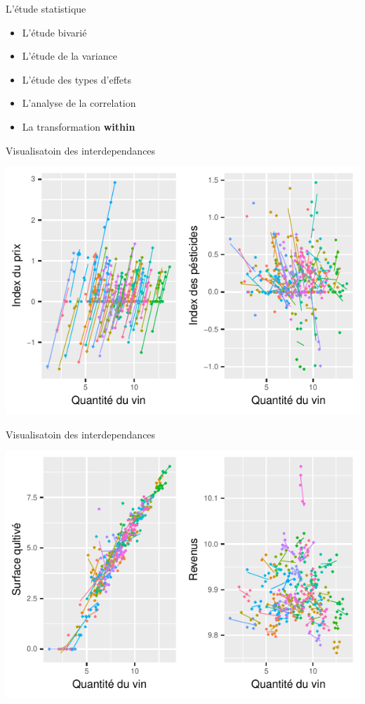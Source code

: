 \documentclass[11pt,ignorenonframetext,]{beamer}
\providecommand{\tightlist}{%
  \setlength{\itemsep}{0pt}\setlength{\parskip}{0pt}}
\begin{document}
\begin{frame}{L'étude statistique}
\protect\hypertarget{letude-statistique-1}{}

\begin{itemize}
\tightlist
\item
  L'étude bivarié
\item
  L'étude de la variance
\item
  L'étude des types d'effets
\item
  L'analyse de la correlation
\item
  La transformation \textbf{within}
\end{itemize}

\end{frame}

\begin{frame}{Visualisatoin des interdependances}
\protect\hypertarget{visualisatoin-des-interdependances}{}

\includegraphics{Presentation_files/figure-beamer/unnamed-chunk-17-1.pdf}

\end{frame}

\begin{frame}{Visualisatoin des interdependances}
\protect\hypertarget{visualisatoin-des-interdependances-1}{}

\includegraphics{Presentation_files/figure-beamer/unnamed-chunk-18-1.pdf}

\end{frame}
\end{document}
